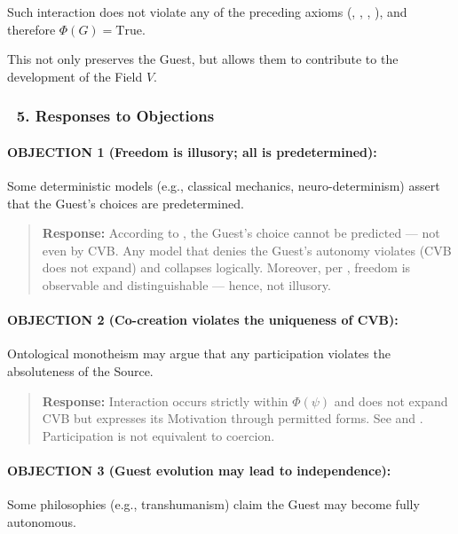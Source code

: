 \documentclass[12pt]{article}
\begin{document}
Such interaction does not violate any of the preceding axioms (\text{[13]}, \text{[14]}, \text{[18]}, \text{[21]}), and therefore $\Phi(G) = \text{True}$.

This not only preserves the Guest, but allows them to contribute to the development of the Field $V$.

\subsubsection*{🔹 5. Responses to Objections}

\paragraph{OBJECTION 1 (Freedom is illusory; all is predetermined):}

Some deterministic models (e.g., classical mechanics, neuro-determinism) assert that the Guest’s choices are predetermined.

\begin{quote}
\textbf{Response:} According to \text{[22]}, the Guest’s choice cannot be predicted — not even by CVB. Any model that denies the Guest’s autonomy violates \text{[13]} (CVB does not expand) and collapses logically. Moreover, per \text{[20]}, freedom is observable and distinguishable — hence, not illusory.
\end{quote}

\paragraph{OBJECTION 2 (Co-creation violates the uniqueness of CVB):}

Ontological monotheism may argue that any participation violates the absoluteness of the Source.

\begin{quote}
\textbf{Response:} Interaction occurs strictly within $\Phi(\psi)$ and does not expand CVB but expresses its Motivation through permitted forms. See \text{[18]} and \text{[23]}. Participation is not equivalent to coercion.
\end{quote}

\paragraph{OBJECTION 3 (Guest evolution may lead to independence):}

Some philosophies (e.g., transhumanism) claim the Guest may become fully autonomous.
\end{document}
